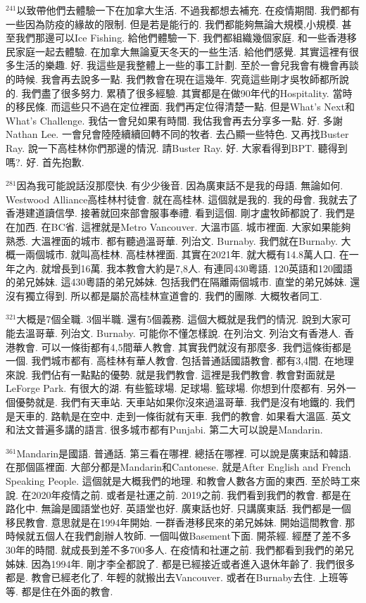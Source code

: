 \documentclass{book}
\begin{document}
$^{241}$以致帶他們去體驗一下在加拿大生活.
不過我都想去補充.
在疫情期間.
我們都有一些因為防疫的緣故的限制.
但是若是能行的.
我們都能夠無論大規模,小規模.
甚至我們那邊可以Ice Fishing.
給他們體驗一下.
我們都組織幾個家庭.
和一些香港移民家庭一起去體驗.
在加拿大無論夏天冬天的一些生活.
給他們感覺.
其實這裡有很多生活的樂趣.
好.
我這些是我整體上一些的事工計劃.
至於一會兒我會有機會再談的時候.
我會再去說多一點.
我們教會在現在這幾年.
究竟這些剛才吳牧師都所說的.
我們盡了很多努力.
累積了很多經驗.
其實都是在做90年代的Hospitality.
當時的移民條.
而這些只不過在定位裡面.
我們再定位得清楚一點.
但是What's Next和What's Challenge.
我估一會兒如果有時間.
我估我會再去分享多一點.
好.
多謝Nathan Lee.
一會兒會陸陸續續回轉不同的牧者.
去凸顯一些特色.
又再找Buster Ray.
說一下高桂林你們那邊的情況.
請Buster Ray.
好.
大家看得到BPT.
聽得到嗎?.
好.
首先抱歉.

$^{281}$因為我可能說話沒那麼快.
有少少後音.
因為廣東話不是我的母語.
無論如何.
Westwood Alliance高桂林村徒會.
就在高桂林.
這個就是我的.
我的母會.
我就去了香港建道讀信學.
接著就回來部會服事奉禮.
看到這個.
剛才盧牧師都說了.
我們是在加西.
在BC省.
這裡就是Metro Vancouver.
大溫市區.
城市裡面.
大家如果能夠熟悉.
大溫裡面的城市.
都有聽過溫哥華.
列治文.
Burnaby.
我們就在Burnaby.
大概一兩個城市.
就叫高桂林.
高桂林裡面.
其實在2021年.
就大概有14.8萬人口.
在一年之內.
就增長到16萬.
我本教會大約是7,8人.
有連同430粵語.
120英語和120國語的弟兄姊妹.
這430粵語的弟兄姊妹.
包括我們在隔離兩個城市.
直堂的弟兄姊妹.
還沒有獨立得到.
所以都是屬於高桂林宣道會的.
我們的團隊.
大概牧者同工.

$^{321}$大概是7個全職.
3個半職.
還有5個義務.
這個大概就是我們的情況.
說到大家可能去溫哥華.
列治文.
Burnaby.
可能你不懂怎樣說.
在列治文.
列治文有香港人.
香港教會.
可以一條街都有4,5間華人教會.
其實我們就沒有那麼多.
我們這條街都是一個.
我們城市都有.
高桂林有華人教會.
包括普通話國語教會.
都有3,4間.
在地理來說.
我們佔有一點點的優勢.
就是我們教會.
這裡是我們教會.
教會對面就是LeForge Park.
有很大的湖.
有些籃球場.
足球場.
籃球場.
你想到什麼都有.
另外一個優勢就是.
我們有天車站.
天車站如果你沒來過溫哥華.
我們是沒有地鐵的.
我們是天車的.
路軌是在空中.
走到一條街就有天車.
我們的教會.
如果看大溫區.
英文和法文普遍多講的語言.
很多城市都有Punjabi.
第二大可以說是Mandarin.

$^{361}$Mandarin是國語.
普通話.
第三看在哪裡.
總括在哪裡.
可以說是廣東話和韓語.
在那個區裡面.
大部分都是Mandarin和Cantonese.
就是After English and French Speaking People.
這個就是大概我們的地理.
和教會人數各方面的東西.
至於時工來說.
在2020年疫情之前.
或者是社運之前.
2019之前.
我們看到我們的教會.
都是在路化中.
無論是國語堂也好.
英語堂也好.
廣東話也好.
只講廣東話.
我們都是一個移民教會.
意思就是在1994年開始.
一群香港移民來的弟兄姊妹.
開始這間教會.
那時候就五個人在我們創辦人牧師.
一個叫做Basement下面.
開茶經.
經歷了差不多30年的時間.
就成長到差不多700多人.
在疫情和社運之前.
我們都看到我們的弟兄姊妹.
因為1994年.
剛才李全都說了.
都是已經接近或者進入退休年齡了.
我們很多都是.
教會已經老化了.
年輕的就搬出去Vancouver.
或者在Burnaby去住.
上班等等.
都是住在外面的教會.
\end{document}
